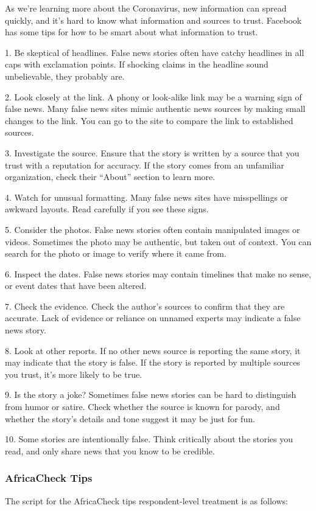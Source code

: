 \documentclass[letterpaper, 12pt, parskip=full,DIV=10]{scrartcl}
\begin{document}
As we're learning more about the Coronavirus, new information can spread quickly, and it's hard to know what information and sources to trust. Facebook has some tips for how to be smart about what information to trust. 

1. Be skeptical of headlines. False news stories often have catchy headlines in all caps with exclamation points. If shocking claims in the headline sound unbelievable, they probably are.

2. Look closely at the link. A phony or look-alike link may be a warning sign of false news. Many false news sites mimic authentic news sources by making small changes to the link. You can go to the site to compare the link to established sources.

3. Investigate the source. Ensure that the story is written by a source that you trust with a reputation for accuracy. If the story comes from an unfamiliar organization, check their ``About'' section to learn more.

4. Watch for unusual formatting. Many false news sites have misspellings or awkward layouts. Read carefully if you see these signs.

5. Consider the photos. False news stories often contain manipulated images or videos. Sometimes the photo may be authentic, but taken out of context. You can search for the photo or image to verify where it came from.

6. Inspect the dates. False news stories may contain timelines that make no sense, or event dates that have been altered.

7. Check the evidence. Check the author's sources to confirm that they are accurate. Lack of evidence or reliance on unnamed experts may indicate a false news story.

8. Look at other reports. If no other news source is reporting the same story, it may indicate that the story is false. If the story is reported by multiple sources you trust, it's more likely to be true.

9. Is the story a joke? Sometimes false news stories can be hard to distinguish from humor or satire. Check whether the source is known for parody, and whether the story's details and tone suggest it may be just for fun.

10. Some stories are intentionally false. Think critically about the stories you read, and only share news that you know to be credible.



\subsubsection{AfricaCheck Tips}\label{sec:actips}
The script for the AfricaCheck tips respondent-level treatment is as follows:
\end{document}
